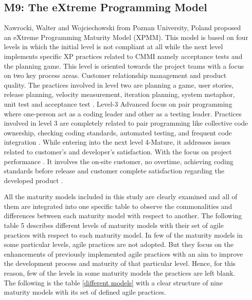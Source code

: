 \documentclass[a4paper,oneside]{bth}
\begin{document}
\subsection{M9: The eXtreme Programming Model}
Nawrocki, Walter and Wojciechowski from Poznan University, Poland proposed an eXtreme Programming Maturity Model (XPMM). This model is based on four levels in which the initial level is not compliant at all while the next level implements specific XP practices related to CMMI namely acceptance tests and the planning game. This level is oriented towards the project teams with a focus on two key process areas. Customer relationship management and product quality. The practices involved in level two are planning a game, user stories, release planning, velocity measurement, iteration planning, system metaphor, unit test and acceptance test \cite{nawrocki_toward_2001}. Level-3 Advanced focus on pair programming where one-person act as a coding leader and other as a testing leader. Practices involved in level 3 are completely related to pair programming like collective code ownership, checking coding standards, automated testing, and frequent code integration \cite{nawrocki_toward_2001}. While entering into the next level 4-Mature, it addresses issues related to customer’s and developer’s satisfaction. With the focus on project performance \cite{nawrocki_toward_2001}. It involves the on-site customer, no overtime, achieving coding standards before release and customer complete satisfaction regarding the developed product \cite{nawrocki_toward_2001}.

All the maturity models included in this study are clearly examined and all of them are integrated into one specific table to observe the commonalities and differences between each maturity model with respect to another. The following table 5 describes different levels of maturity models with their set of agile practices with respect to each maturity model. In few of the maturity models in some particular levels, agile practices are not adopted. But they focus on the enhancements of previously implemented agile practices with an aim to improve the development process and maturity of that particular level. Hence, for this reason, few of the levels in some maturity models the practices are left blank. The following is the table \ref{different models} with a clear structure of nine maturity models with its set of defined agile practices. 
\end{document}
